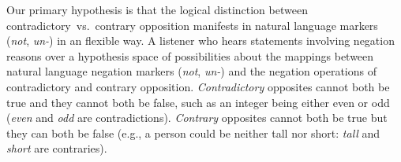 \documentclass[floatsintext,doc]{apa6}
\begin{document}
Our primary hypothesis is that the logical distinction between contradictory~vs.~contrary opposition manifests in natural language markers (\emph{not}, \emph{un-}) in an flexible way. %
A listener who hears statements involving negation reasons over a hypothesis space of possibilities about the mappings between natural language negation markers  (\emph{not}, \emph{un-}) and the negation operations of contradictory and contrary opposition.
\emph{Contradictory} opposites cannot both be true and they cannot both be false, such as an integer being either even or odd (\emph{even} and \emph{odd} are contradictions).
\emph{Contrary} opposites cannot both be true but they can both be false (e.g., a person could be neither tall nor short: \emph{tall} and \emph{short} are contraries). 
\end{document}
